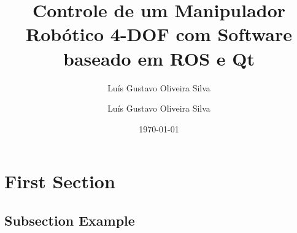 \documentclass{beamer}
\title[]{Controle de um Manipulador Robótico 4-DOF com Software baseado em ROS e Qt} %
\author{Luís Gustavo Oliveira Silva} %
\author{Luís Gustavo Oliveira Silva} %
\institute[UFRJ] %
{
\large{Orientador: Fernando Cesar Lizarralde} \\
\medskip
Universidade Federeal do Rio de Janeiro \\ %
\textit{} %
}
\date{\today} %
\begin{document}
\begin{frame}
\titlepage %
\end{frame}



\section{First Section} %

\subsection{Subsection Example} %
\end{document}

